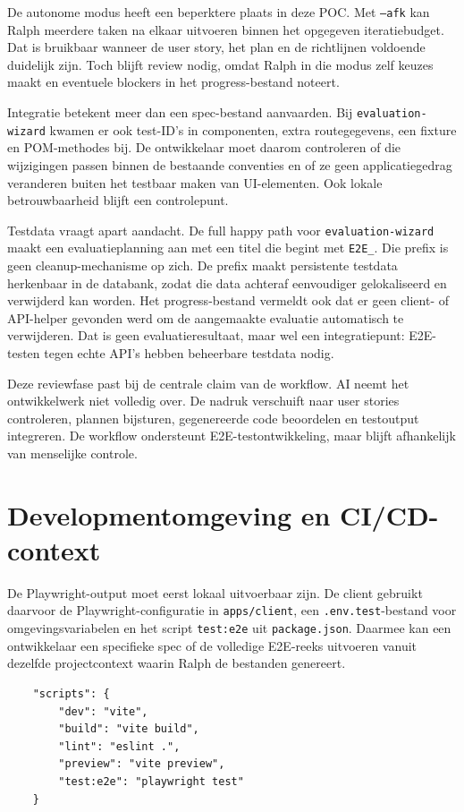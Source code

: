 De autonome modus heeft een beperktere plaats in deze POC. Met \texttt{--afk} kan Ralph meerdere taken na elkaar uitvoeren binnen het opgegeven iteratiebudget. Dat is bruikbaar wanneer de user story, het plan en de richtlijnen voldoende duidelijk zijn. Toch blijft review nodig, omdat Ralph in die modus zelf keuzes maakt en eventuele blockers in het progress-bestand noteert.

Integratie betekent meer dan een spec-bestand aanvaarden. Bij \texttt{evaluation-wizard} kwamen er ook test-ID's in componenten, extra routegegevens, een fixture en POM-methodes bij. De ontwikkelaar moet daarom controleren of die wijzigingen passen binnen de bestaande conventies en of ze geen applicatiegedrag veranderen buiten het testbaar maken van UI-elementen. Ook lokale betrouwbaarheid blijft een controlepunt.

Testdata vraagt apart aandacht. De full happy path voor \texttt{evaluation-wizard} maakt een evaluatieplanning aan met een titel die begint met \texttt{E2E\_}. Die prefix is geen cleanup-mechanisme op zich. De prefix maakt persistente testdata herkenbaar in de databank, zodat die data achteraf eenvoudiger gelokaliseerd en verwijderd kan worden. Het progress-bestand vermeldt ook dat er geen client- of API-helper gevonden werd om de aangemaakte evaluatie automatisch te verwijderen. Dat is geen evaluatieresultaat, maar wel een integratiepunt: E2E-testen tegen echte API's hebben beheerbare testdata nodig.

Deze reviewfase past bij de centrale claim van de workflow. AI neemt het ontwikkelwerk niet volledig over. De nadruk verschuift naar user stories controleren, plannen bijsturen, gegenereerde code beoordelen en testoutput integreren. De workflow ondersteunt E2E-testontwikkeling, maar blijft afhankelijk van menselijke controle.

\section{Developmentomgeving en CI/CD-context}

De Playwright-output moet eerst lokaal uitvoerbaar zijn. De client gebruikt daarvoor de Playwright-configuratie in \texttt{apps/client}, een \texttt{.env.test}-bestand voor omgevingsvariabelen en het script \texttt{test:e2e} uit \texttt{package.json}. Daarmee kan een ontwikkelaar een specifieke spec of de volledige E2E-reeks uitvoeren vanuit dezelfde projectcontext waarin Ralph de bestanden genereert.

\begin{verbatim}
    "scripts": {
        "dev": "vite",
        "build": "vite build",
        "lint": "eslint .",
        "preview": "vite preview",
        "test:e2e": "playwright test"
    }
\end{verbatim}

